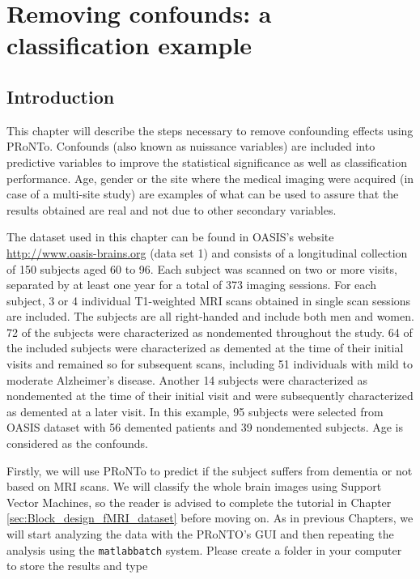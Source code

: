 
\chapter{Removing confounds: a classification example}
\label{sec:confounds_clas}
\minitoc

\section{Introduction}

This chapter will describe the steps necessary to remove confounding effects using PRoNTo. Confounds (also known as nuissance variables) are included into predictive variables to improve the statistical significance as well as classification performance. Age, gender or the site where the medical imaging were acquired (in case of a multi-site study) are examples of what can be used to assure that the results obtained are real and not due to other secondary variables.

The dataset used in this chapter can be found in OASIS's website \url{http://www.oasis-brains.org} (data set 1) and consists of a longitudinal collection of 150 subjects aged 60 to 96. Each subject was scanned on two or more visits, separated by at least one year for a total of 373 imaging sessions. For each subject, 3 or 4 individual T1-weighted MRI scans obtained in single scan sessions are included. The subjects are all right-handed and include both men and women. 72 of the subjects were characterized as nondemented throughout the study. 64 of the included subjects were characterized as demented at the time of their initial visits and remained so for subsequent scans, including 51 individuals with mild to moderate Alzheimer’s disease. Another 14 subjects were characterized as nondemented at the time of their initial visit and were subsequently characterized as demented at a later visit. In this example, 95 subjects were selected from OASIS dataset with 56 demented patients and 39 nondemented subjects. Age is considered as the confounds. 

Firstly, we will use PRoNTo to predict if the subject suffers from dementia or not based on MRI scans. We will classify the whole brain images using Support Vector Machines, so the reader is advised to complete the tutorial in Chapter \ref{sec:Block_design_fMRI_dataset} before moving on.
As in previous Chapters, we will start analyzing the data with the PRoNTO's GUI and then repeating the analysis using the {\tt matlabbatch}  system. Please create a folder in your computer to store the results and type


